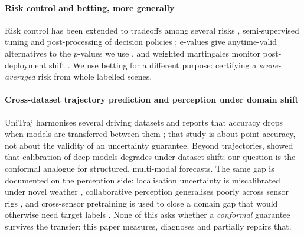 \paragraph{Risk control and betting, more generally}
Risk control has been extended to tradeoffs among several risks \cite{nguyen2024tradeoffs}, semi-supervised tuning
\cite{einbinder2024semisupervised} and post-processing of decision policies \cite{joshi2026riskcontrolled}; e-values give
anytime-valid alternatives to the $p$-values we use \cite{gauthier2025evalues}, and weighted martingales monitor
post-deployment shift \cite{prinster2025watch}. We use betting for a different purpose: certifying a \emph{scene-averaged}
risk from whole labelled scenes.

\paragraph{Cross-dataset trajectory prediction and perception under domain shift}
UniTraj harmonises several driving datasets and reports that accuracy drops when models are transferred between them
\cite{feng2024unitraj}; that study is about point accuracy, not about the validity of an uncertainty guarantee.
Beyond trajectories, \cite{ovadia2019can} showed that calibration of deep models degrades under dataset shift; our
question is the conformal analogue for structured, multi-modal forecasts. The same gap is documented on the perception
side: localisation uncertainty is miscalibrated under novel weather \cite{wu2025visuallocalization}, collaborative
perception generalises poorly across sensor rigs \cite{wang2025collaborative}, and cross-sensor pretraining is used to
close a domain gap that would otherwise need target labels \cite{kong2025largead,qiu2026crosssensor}. None of this asks
whether a \emph{conformal} guarantee survives the transfer; this paper measures, diagnoses and partially repairs that.
